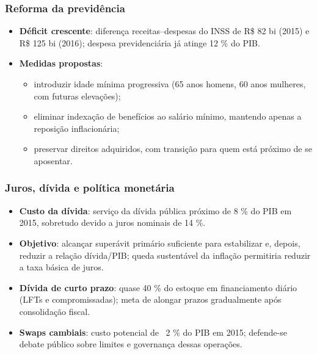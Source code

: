 \documentclass[a4paper,12pt]{article}[abntex2]
\begin{document}
\subsubsection{\textbf{Reforma da previdência}}
\begin{itemize}
    \item \textbf{Déficit crescente}: diferença receitas–despesas do INSS de R\$ 82 bi (2015) e R\$ 125 bi (2016); despesa previdenciária já atinge 12 \% do PIB.  
    \item \textbf{Medidas propostas}: 
    \begin{itemize}
        \item introduzir idade mínima progressiva (65 anos homens, 60 anos mulheres, com futuras elevações);  
        \item eliminar indexação de benefícios ao salário mínimo, mantendo apenas a reposição inflacionária;  
        \item preservar direitos adquiridos, com transição para quem está próximo de se aposentar.
    \end{itemize}
\end{itemize}

\subsubsection{\textbf{Juros, dívida e política monetária}}
\begin{itemize}
    \item \textbf{Custo da dívida}: serviço da dívida pública próximo de 8 \% do PIB em 2015, sobretudo devido a juros nominais de 14 \%.  
    \item \textbf{Objetivo}: alcançar superávit primário suficiente para estabilizar e, depois, reduzir a relação dívida/PIB; queda sustentável da inflação permitiria reduzir a taxa básica de juros.  
    \item \textbf{Dívida de curto prazo}: quase 40 \% do estoque em financiamento diário (LFTs e compromissadas); meta de alongar prazos gradualmente após consolidação fiscal.  
    \item \textbf{Swaps cambiais}: custo potencial de ~2 \% do PIB em 2015; defende-se debate público sobre limites e governança dessas operações.
\end{itemize}
\end{document}

